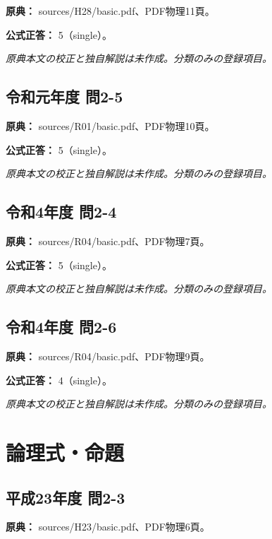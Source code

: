 \noindent\textbf{原典：} sources/H28/basic.pdf、PDF物理11頁。

\textbf{公式正答：} 5（single）。

\par\textit{原典本文の校正と独自解説は未作成。分類のみの登録項目。}

\subsection{令和元年度 問2-5}
\label{q:r01-reg-basic-2-5}

\noindent\textbf{原典：} sources/R01/basic.pdf、PDF物理10頁。

\textbf{公式正答：} 5（single）。

\par\textit{原典本文の校正と独自解説は未作成。分類のみの登録項目。}

\subsection{令和4年度 問2-4}
\label{q:r04-reg-basic-2-4}

\noindent\textbf{原典：} sources/R04/basic.pdf、PDF物理7頁。

\textbf{公式正答：} 5（single）。

\par\textit{原典本文の校正と独自解説は未作成。分類のみの登録項目。}

\subsection{令和4年度 問2-6}
\label{q:r04-reg-basic-2-6}

\noindent\textbf{原典：} sources/R04/basic.pdf、PDF物理9頁。

\textbf{公式正答：} 4（single）。

\par\textit{原典本文の校正と独自解説は未作成。分類のみの登録項目。}

\section{論理式・命題}

\subsection{平成23年度 問2-3}
\label{q:h23-reg-basic-2-3}

\noindent\textbf{原典：} sources/H23/basic.pdf、PDF物理6頁。

